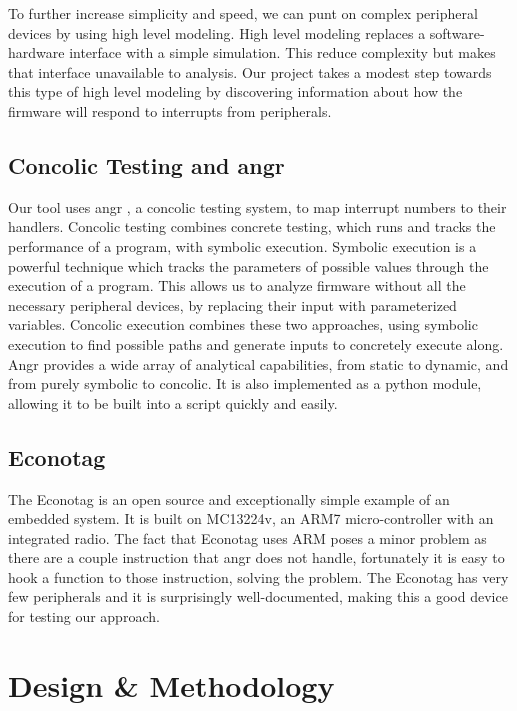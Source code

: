 \documentclass[letterpaper, 10 pt, conference]{ieeeconf}
\begin{document}
To further increase simplicity and speed, we can punt on complex peripheral devices by using high level modeling. High level modeling replaces a software-hardware interface with a simple simulation. This reduce complexity but makes that interface unavailable to analysis. Our project takes a modest step towards this type of high level modeling by discovering information about how the firmware will respond to interrupts from peripherals.

\subsection{Concolic Testing and angr} \label{concolic}
Our tool uses angr \cite{angr}, a concolic testing system, to map interrupt numbers to their handlers. Concolic testing combines concrete testing, which runs and tracks the performance of a program, with symbolic execution. Symbolic execution is a powerful technique which tracks the parameters of possible values through the execution of a program. This allows us to analyze firmware without all the necessary peripheral devices, by replacing their input with parameterized variables. Concolic execution combines these two approaches, using symbolic execution to find possible paths and generate inputs to concretely execute along. Angr provides a wide array of analytical capabilities, from static to dynamic, and from purely symbolic to concolic. It is also implemented as a python module, allowing it to be built into a script quickly and easily.

\subsection{Econotag} \label{econotag}
The Econotag \cite{etag} is an open source and exceptionally simple example of an embedded system. It is built on MC13224v, an ARM7 micro-controller with an integrated radio. The fact that Econotag uses ARM poses a minor problem as there are a couple instruction that angr does not handle, fortunately it is easy to hook a function to those instruction, solving the problem. The Econotag has very few peripherals and it is surprisingly well-documented, making this a good device for testing our approach.

\section{Design \& Methodology} \label{method}
\end{document}
